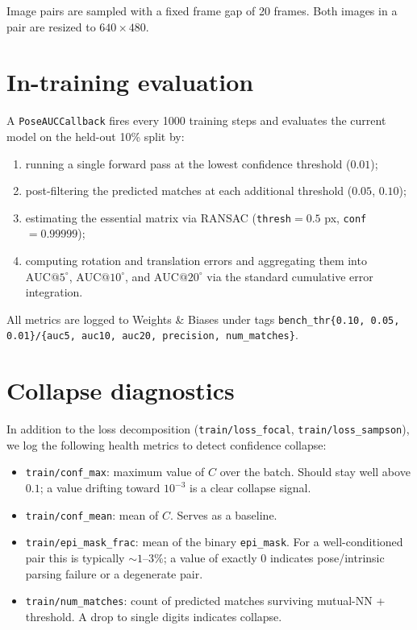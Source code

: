 \documentclass[11pt]{article}
\begin{document}
Image pairs are sampled with a fixed frame gap of \num{20} frames. Both
images in a pair are resized to $640 \times 480$.

\section{In-training evaluation}
\label{sec:eval}

A \texttt{PoseAUCCallback} fires every \num{1000} training steps and
evaluates the current model on the held-out \num{10}\% split by:
\begin{enumerate}[leftmargin=*]
  \item running a single forward pass at the lowest confidence
        threshold ($0.01$);
  \item post-filtering the predicted matches at each additional
        threshold ($0.05$, $0.10$);
  \item estimating the essential matrix via RANSAC
        (\texttt{thresh}$= 0.5$ px, \texttt{conf}$=0.99999$);
  \item computing rotation and translation errors and aggregating them
        into $\mathrm{AUC}@5^\circ$, $\mathrm{AUC}@10^\circ$, and
        $\mathrm{AUC}@20^\circ$ via the standard cumulative error
        integration.
\end{enumerate}

All metrics are logged to Weights \& Biases under tags
\texttt{bench\_thr\{0.10, 0.05, 0.01\}/\{auc5, auc10, auc20, precision, num\_matches\}}.

\section{Collapse diagnostics}

In addition to the loss decomposition
(\texttt{train/loss\_focal}, \texttt{train/loss\_sampson}), we log the
following health metrics to detect confidence collapse:
\begin{itemize}[leftmargin=*]
  \item \texttt{train/conf\_max}: maximum value of $C$ over the batch.
        Should stay well above $0.1$; a value drifting toward $10^{-3}$
        is a clear collapse signal.
  \item \texttt{train/conf\_mean}: mean of $C$. Serves as a baseline.
  \item \texttt{train/epi\_mask\_frac}: mean of the binary
        \texttt{epi\_mask}. For a well-conditioned pair this is
        typically $\sim$$1$--$3\%$; a value of exactly $0$ indicates
        pose/intrinsic parsing failure or a degenerate pair.
  \item \texttt{train/num\_matches}: count of predicted matches
        surviving mutual-NN + threshold. A drop to single digits
        indicates collapse.
\end{itemize}
\end{document}
